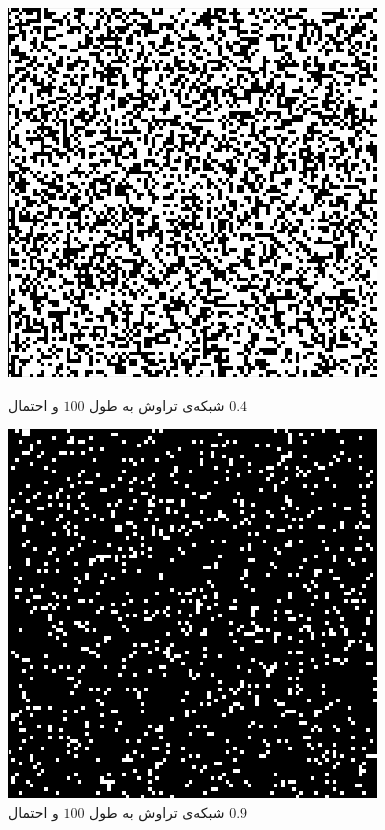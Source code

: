 \documentclass[11pt, a4paper]{article}
\begin{document}
\begin{figure}[h]
	\centering
  \begin{minipage}[b]{0.48\textwidth}
    \includegraphics[width=\textwidth]{q1_100_0.4.png}
    \caption{شبکه‌ی تراوش به طول $100$ و احتمال $0.4$}
    \label{fig:q1_100_.4}
  \end{minipage}
  \hfill
  \begin{minipage}[b]{0.48\textwidth}
    \includegraphics[width=\textwidth]{q1_100_0.9}
    \caption{شبکه‌ی تراوش به طول $100$ و احتمال $0.9$}
    \label{fig:q1_100_.9}
  \end{minipage}
\end{figure}
\end{document}

